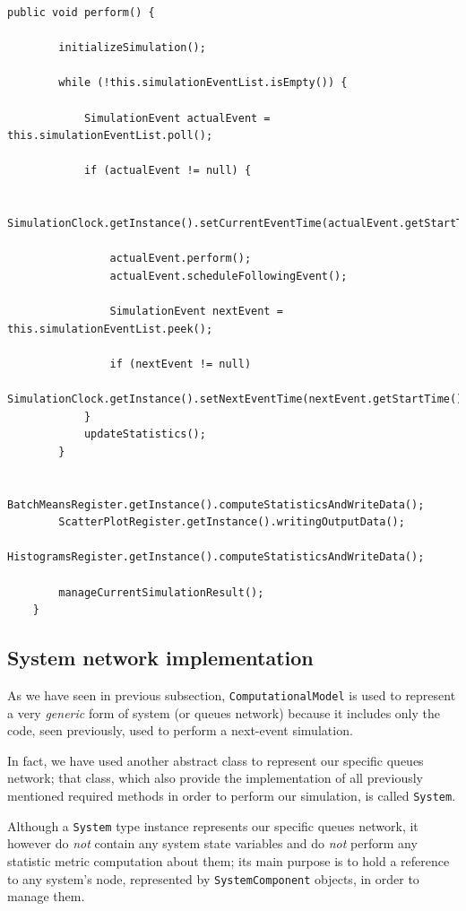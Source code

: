 \documentclass[10pt,a4paper]{article}
\begin{document}
\begin{lstlisting}[frame=lines, caption={Snippet of \texttt{perform} method}, label={code:perform}]
public void perform() {

        initializeSimulation();

        while (!this.simulationEventList.isEmpty()) {

            SimulationEvent actualEvent = this.simulationEventList.poll();

            if (actualEvent != null) {

                SimulationClock.getInstance().setCurrentEventTime(actualEvent.getStartTime());

                actualEvent.perform();
                actualEvent.scheduleFollowingEvent();

                SimulationEvent nextEvent = this.simulationEventList.peek();

                if (nextEvent != null)
                    SimulationClock.getInstance().setNextEventTime(nextEvent.getStartTime());
            }
            updateStatistics();
        }

        BatchMeansRegister.getInstance().computeStatisticsAndWriteData();
        ScatterPlotRegister.getInstance().writingOutputData();
        HistogramsRegister.getInstance().computeStatisticsAndWriteData();

        manageCurrentSimulationResult();
    }
\end{lstlisting}


\subsection{System network implementation}

As we have seen in previous subsection, \texttt{ComputationalModel} is used to represent a very \textit{generic} form of system (or queues network) because it includes only the code, seen previously, used to perform a next-event simulation.  

In fact, we have used another abstract class to represent our specific queues network; that class, which also provide the implementation of all previously mentioned required methods in order to perform our simulation, is called \texttt{System}.

Although a \texttt{System} type instance represents our specific queues network, it however do \textit{not} contain any system state variables and do \textit{not} perform any statistic metric computation about them; its main purpose is to hold a reference to any system's node, represented by \texttt{SystemComponent} objects, in order to manage them. 
\end{document}
